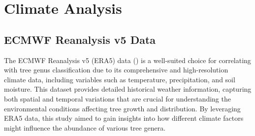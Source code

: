 \chapter{Climate Analysis}
\label{chapter:climate}
\section{ECMWF Reanalysis v5 Data}

The ECMWF Reanalysis v5 (ERA5) data (\cite{era5}) is a well-suited choice for correlating with tree genus classification due to its comprehensive and high-resolution climate data, including variables such as temperature, precipitation, and soil moisture. This dataset provides detailed historical weather information, capturing both spatial and temporal variations that are crucial for understanding the environmental conditions affecting tree growth and distribution. By leveraging ERA5 data, this study aimed to gain insights into how different climate factors might influence the abundance of various tree genera.

